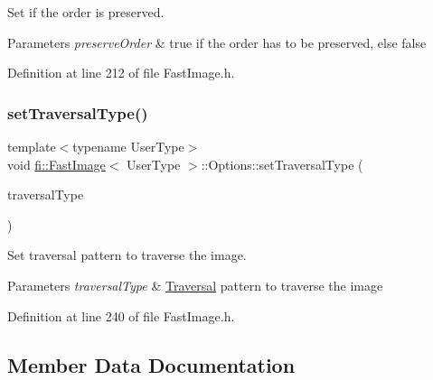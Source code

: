 Set if the order is preserved. 


\begin{DoxyParams}{Parameters}
{\em preserve\+Order} & true if the order has to be preserved, else false \\
\hline
\end{DoxyParams}


Definition at line 212 of file Fast\+Image.\+h.

\mbox{\label{classfi_1_1FastImage_1_1Options_a36359a742735265d1aea6c0463e98d53}} 
\subsubsection{\texorpdfstring{set\+Traversal\+Type()}{setTraversalType()}}
{\footnotesize\ttfamily template$<$typename User\+Type$>$ \\
void \hyperlink{classfi_1_1FastImage}{fi\+::\+Fast\+Image}$<$ User\+Type $>$\+::Options\+::set\+Traversal\+Type (\begin{DoxyParamCaption}\item[{\hyperlink{namespacefi_a7ba5ce68668e7f273b22e5f56ca6dfcb}{Traversal\+Type}}]{traversal\+Type }\end{DoxyParamCaption})\hspace{0.3cm}{\ttfamily [inline]}}



Set traversal pattern to traverse the image. 


\begin{DoxyParams}{Parameters}
{\em traversal\+Type} & \hyperlink{classfi_1_1Traversal}{Traversal} pattern to traverse the image \\
\hline
\end{DoxyParams}


Definition at line 240 of file Fast\+Image.\+h.



\subsection{Member Data Documentation}
\mbox{\label{classfi_1_1FastImage_1_1Options_acb814a9b2343a6d60ab40f46e37bebda}} 
